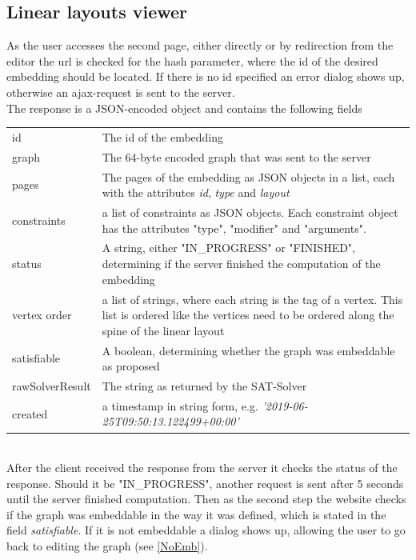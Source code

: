 \subsection{Linear layouts viewer}
\label{viewerOV}
As the user accesses the second page, either directly or by redirection from the editor the url is checked for the hash parameter, where the id of the desired embedding should be located. If there is no id specified an error dialog shows up, otherwise an ajax-request is sent to the server.\\
The response is a JSON-encoded object and contains the following fields \cite{linearLayoutApi}\\[12px]
\begin{tabular}{l p{}}
id & The id of the embedding\\
graph & The 64-byte encoded graph that was sent to the server\\
pages & The pages of the embedding as JSON objects in a list, each with the attributes \textit{id}, \textit{type} and \textit{layout}\\
constraints & a list of constraints as JSON objects. Each constraint object has the attributes "type", "modifier" and "arguments".\\
status & A string, either "IN\_PROGRESS" or "FINISHED", determining if the server finished the computation of the embedding\\
vertex order & a list of strings, where each string is the tag of a vertex. This list is ordered like the vertices need to be ordered along the spine of the linear layout\\
satisfiable & A boolean, determining whether the graph was embeddable as proposed\\
rawSolverResult & The string as returned by the SAT-Solver\\
created & a timestamp in string form, e.g. \textit{'2019-06-25T09:50:13.122499+00:00'}
\end{tabular}\\[12pt]
After the client received the response from the server it checks the status of the response. Should it be "IN\_PROGRESS", another request is sent after 5 seconds until the server finished computation. Then as the second step the website checks if the graph was embeddable in the way it was defined, which is stated in the field \textit{satisfiable}. If it is not embeddable a dialog shows up, allowing the user to go back to editing the graph (see \autoref{NoEmb}).\\
